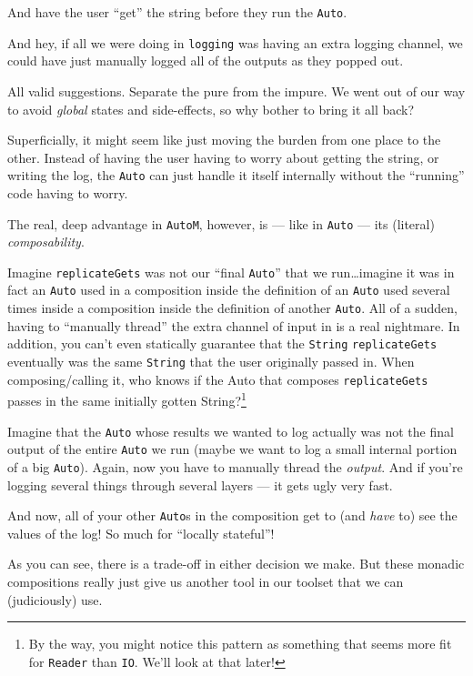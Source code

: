 \documentclass[]{article}
\begin{document}
And have the user ``get'' the string before they run the \texttt{Auto}.

And hey, if all we were doing in \texttt{logging} was having an extra
logging channel, we could have just manually logged all of the outputs
as they popped out.

All valid suggestions. Separate the pure from the impure. We went out of
our way to avoid \emph{global} states and side-effects, so why bother to
bring it all back?

Superficially, it might seem like just moving the burden from one place
to the other. Instead of having the user having to worry about getting
the string, or writing the log, the \texttt{Auto} can just handle it
itself internally without the ``running'' code having to worry.

The real, deep advantage in \texttt{AutoM}, however, is --- like in
\texttt{Auto} --- its (literal) \emph{composability}.

Imagine \texttt{replicateGets\textquotesingle{}} was not our ``final
\texttt{Auto}'' that we run\ldots{}imagine it was in fact an
\texttt{Auto} used in a composition inside the definition of an
\texttt{Auto} used several times inside a composition inside the
definition of another \texttt{Auto}. All of a sudden, having to
``manually thread'' the extra channel of input in is a real nightmare.
In addition, you can't even statically guarantee that the
\texttt{String} \texttt{replicateGets} eventually was the same
\texttt{String} that the user originally passed in. When
composing/calling it, who knows if the Auto that composes
\texttt{replicateGets\textquotesingle{}} passes in the same initially
gotten String?\footnote{By the way, you might notice this pattern as
  something that seems more fit for \texttt{Reader} than \texttt{IO}.
  We'll look at that later!}

Imagine that the \texttt{Auto} whose results we wanted to log actually
was not the final output of the entire \texttt{Auto} we run (maybe we
want to log a small internal portion of a big \texttt{Auto}). Again, now
you have to manually thread the \emph{output}. And if you're logging
several things through several layers --- it gets ugly very fast.

And now, all of your other \texttt{Auto}s in the composition get to (and
\emph{have} to) see the values of the log! So much for ``locally
stateful''!

As you can see, there is a trade-off in either decision we make. But
these monadic compositions really just give us another tool in our
toolset that we can (judiciously) use.
\end{document}
